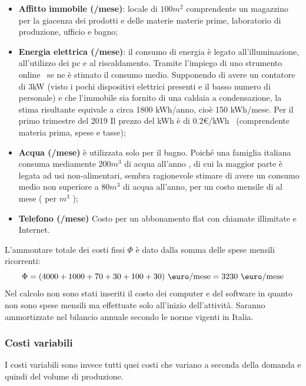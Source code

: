 \begin{itemize}
\item \textbf{Affitto immobile (/mese)}: locale di $100 m^2$
comprendente un magazzino per la giacenza dei prodotti e delle materie materie
prime, laboratorio di produzione, ufficio e bagno;
\item \textbf{Energia elettrica (/mese)}: il consumo di energia è
legato all’illuminazione, all’utilizzo dei pc e al riscaldamento. Tramite
l’impiego di uno strumento online~\cite{lucegas} se ne è stimato il consumo
medio. Supponendo di avere un contatore di 3kW (visto i pochi dispositivi
elettrici presenti e il basso numero di personale) e che l’immobile sia fornito
di una caldaia a condensazione, la stima risultante equivale a circa 1800
kWh/anno, cioè 150 kWh/mese. Per il primo trimestre del 2019 Il prezzo del kWh è
di 0.2\euro/kWh~\cite{segugio} (comprendente materia prima, spese e tasse);

\item \textbf{Acqua (/mese)}  è utilizzata solo per il bagno. Poiché una
famiglia italiana consuma mediamente $200 m^3$ di acqua all’anno \cite{acqua},
di cui la maggior parte è legata ad usi non-alimentari, sembra ragionevole
stimare di avere un consumo medio non superiore a $80 m^3$ di acqua all’anno,
per un costo mensile di  al mese ( per $m^3$ \cite{acquacub});

\item \textbf{Telefono (/mese)} Costo per un abbonamento flat \cite{tim}
con chiamate illimitate e Internet.

\end{itemize}
%

L’ammontare totale dei costi fissi $\Phi$ è dato dalla somma delle spese mensili
ricorrenti:
\begin{displaymath}
\Phi = (4000 + 1000 + 70 + 30 + 100 + 30) \ \mbox{\euro/mese} = 3230 \ 
\mbox{\euro/mese}
\end{displaymath}
Nel calcolo non sono stati inseriti il costo dei computer e del software in
quanto non sono spese mensili ma effettuate solo all’inizio dell’attività.
Saranno ammortizzate nel bilancio annuale secondo le norme vigenti in Italia.
%
\subsubsection{Costi variabili}
I costi variabili sono invece tutti quei costi che variano a seconda della
domanda e quindi del volume di produzione.


